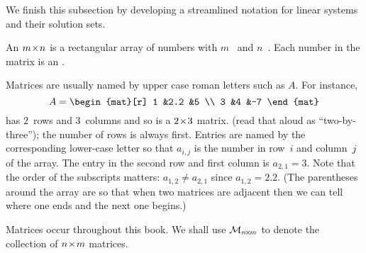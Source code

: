 We finish this subsection by developing a streamlined 
notation for linear systems 
and their solution sets.

\begin{definition}
An \( m \! \times \! n \) 
is a rectangular array of numbers
with \( m \)~ 
and \( n \)~.
Each number in the matrix is an 
.
\end{definition}

Matrices are usually named by upper case roman letters such as 
\( A \).
For instance,
\begin{equation*}
  A=
  \begin{mat}[r]
    1  &2.2  &5  \\
    3  &4    &-7
  \end{mat}
\end{equation*}
has $2$~rows and $3$~columns and so
is a \( 2 \! \times \! 3 \) matrix.
(read that aloud as ``two-by-three'');
the number of rows is always first.
Entries are named by the corresponding lower-case letter
so that $a_{i,j}$
is the number in row~$i$ and column~$j$ of the array.
The entry in the second row and first column is \( a_{2,1}=3 \).
Note that the order of the subscripts matters: 
$a_{1,2}\neq a_{2,1}$ since \( a_{1,2}=2.2 \). 
(The parentheses around the array
are so that when 
two matrices are adjacent then
we can tell where one ends and the next one begins.)

Matrices occur throughout this book.
We shall use 
\( \mathcal{M}_{n \! \times \! m} \) to denote the collection of \( n \! \times \! m \)
matrices.

